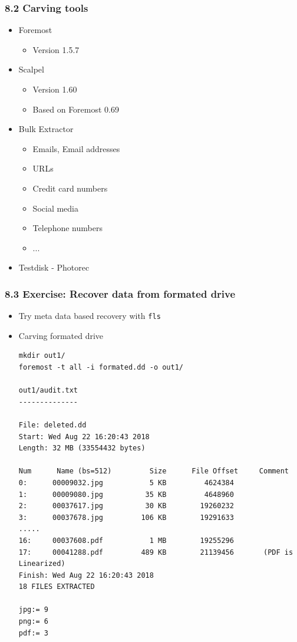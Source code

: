 \begin{frame}[fragile]
  \frametitle{8.2 Carving tools}
    \begin{itemize}
        \item Foremost
            \begin{itemize}
                \item Version 1.5.7
            \end{itemize}
        \item Scalpel
            \begin{itemize}
                \item Version 1.60
                \item Based on Foremost 0.69
            \end{itemize}
        \item Bulk Extractor
            \begin{itemize}
                \item Emails, Email addresses
                \item URLs
                \item Credit card numbers
                \item Social media
                \item Telephone numbers
                \item ...
            \end{itemize}
        \item Testdisk - Photorec
    \end{itemize}
\end{frame}


\begin{frame}[fragile]
    \frametitle{8.3 Exercise: Recover data from formated drive}
    \begin{itemize}
	\item Try meta data based recovery with \texttt{fls}
        \item Carving formated drive
        \begin{lstlisting}[basicstyle=\tiny]
mkdir out1/
foremost -t all -i formated.dd -o out1/

out1/audit.txt
--------------

File: deleted.dd
Start: Wed Aug 22 16:20:43 2018
Length: 32 MB (33554432 bytes)

Num      Name (bs=512)         Size      File Offset     Comment
0:      00009032.jpg           5 KB         4624384
1:      00009080.jpg          35 KB         4648960
2:      00037617.jpg          30 KB        19260232
3:      00037678.jpg         106 KB        19291633
.....
16:     00037608.pdf           1 MB        19255296
17:     00041288.pdf         489 KB        21139456       (PDF is Linearized)
Finish: Wed Aug 22 16:20:43 2018
18 FILES EXTRACTED

jpg:= 9
png:= 6
pdf:= 3
        \end{lstlisting}
    \end{itemize}
\end{frame}






